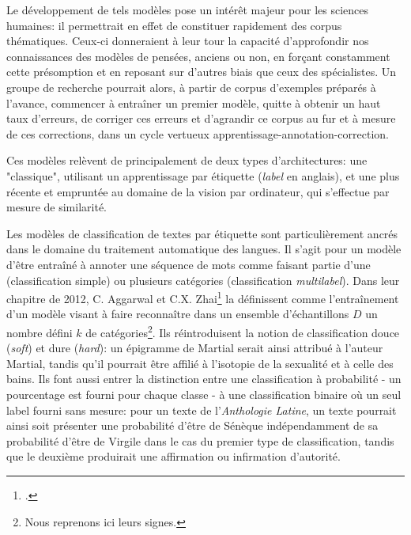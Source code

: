 Le développement de tels modèles pose un intérêt majeur pour les sciences humaines: il permettrait en effet de constituer rapidement des corpus thématiques. Ceux-ci donneraient à leur tour la capacité d'approfondir nos connaissances des modèles de pensées, anciens ou non, en forçant constamment cette présomption et en reposant sur d'autres biais que ceux des spécialistes. Un groupe de recherche pourrait alors, à partir de corpus d'exemples préparés à l'avance, commencer à entraîner un premier modèle, quitte à obtenir un haut taux d'erreurs, de corriger ces erreurs et d'agrandir ce corpus au fur et à mesure de ces corrections, dans un cycle vertueux apprentissage-annotation-correction. 

Ces modèles relèvent de principalement de deux types d'architectures: une "classique", utilisant un apprentissage par étiquette (\textit{label} en anglais), et une plus récente et empruntée au domaine de la vision par ordinateur, qui s'effectue par mesure de similarité.

Les modèles de classification de textes par étiquette sont particulièrement ancrés dans le domaine du traitement automatique des langues. Il s'agit pour un modèle d'être entraîné à annoter une séquence de mots comme faisant partie d'une (classification simple) ou plusieurs catégories (classification \textit{multilabel}). Dans leur chapitre de 2012, C. Aggarwal et C.X. Zhai\footcite{aggarwal_survey_2012} la définissent comme l'entraînement d'un modèle visant à faire reconnaître dans un ensemble d'échantillons $D$ un nombre défini $k$ de catégories\footnote{Nous reprenons ici leurs signes.}. Ils réintroduisent la notion de classification douce (\textit{soft}) et dure (\textit{hard}): un épigramme de Martial serait ainsi attribué à l'auteur Martial, tandis qu'il pourrait être affilié à l'isotopie de la sexualité et à celle des bains. Ils font aussi entrer la distinction entre une classification à probabilité - un pourcentage est fourni pour chaque classe - à une classification binaire où un seul label fourni sans mesure: pour un texte de l'\textit{Anthologie Latine}, un texte pourrait ainsi soit présenter une probabilité d'être de Sénèque indépendamment de sa probabilité d'être de Virgile dans le cas du premier type de classification, tandis que le deuxième produirait une affirmation ou infirmation d'autorité.

